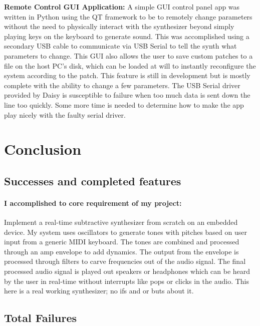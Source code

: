 \documentclass[acmlarge,screen]{acmart}
\begin{document}
	\textbf{Remote Control GUI Application:} A simple GUI control panel app was written in Python using the QT framework to be to remotely change parameters without the need to physically interact with the synthesizer beyond simply playing keys on the keyboard to generate sound. This was accomplished using a secondary USB cable to communicate via USB Serial to tell the synth what parameters to change. This GUI also allows the user to save custom patches to a file on the host PC's disk, which can be loaded at will to instantly reconfigure the system according to the patch. This feature is still in development but is mostly complete with the ability to change a few parameters. The USB Serial driver provided by Daisy is susceptible to failure when too much data is sent down the line too quickly. Some more time is needed to determine how to make the app play nicely with the faulty serial driver.

\section{Conclusion}
	\subsection{Successes and completed features} 
	\paragraph{I accomplished to core requirement of my project:} Implement a real-time subtractive synthesizer from scratch on an embedded device. My system uses oscillators to generate tones with pitches based on user input from a generic MIDI keyboard. The tones are combined and processed through an amp envelope to add dynamics. The output from the envelope is processed through filters to carve frequencies out of the audio signal. The final processed audio signal is played out speakers or headphones which can be heard by the user in real-time without interrupts like pops or clicks in the audio. This here is a real working synthesizer; no ifs and or buts about it.
	
	\subsection{Total Failures}
\end{document}
